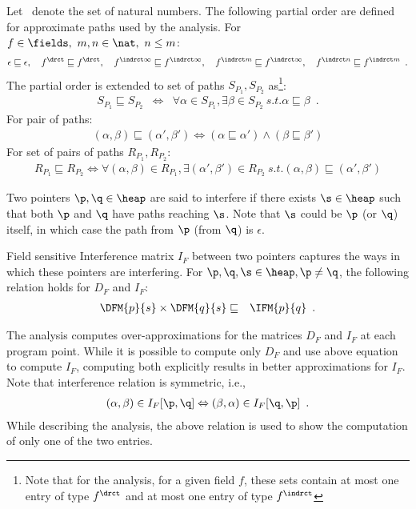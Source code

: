 Let \nat\ denote the set of natural numbers. The
following partial order are defined for approximate paths used by the
analysis. For $ f \in \fields,\ m,n \in \nat,\ n \leq m$:
$$
\epsilon \sqsubseteq \epsilon, \quad 
f^\drct \sqsubseteq  f^\drct,  \quad
f^{\indrct\infty}  \sqsubseteq  f^{\indrct\infty}, \quad
f^{\indrct m} \sqsubseteq f^{\indrct\infty}, \quad
f^{\indrct n} \sqsubseteq f^{\indrct m} \enspace .
$$
The partial order is extended to set of paths $S_{P_1},
S_{P_2}$ as\footnote{Note that for the analysis, for a given
  field $f$, these sets contain at most one entry of type
  $f^\drct$ and at most one entry of type $f^\indrct$}:
\begin{eqnarray*}
  S_{P_1} \sqsubseteq S_{P_2} &\Leftrightarrow& \forall \alpha \in
  S_{P_1}, \exists \beta \in S_{P_2}\ s.t. \alpha \sqsubseteq \beta \enspace .
\end{eqnarray*}
For pair of paths:
\begin{eqnarray*}
  (\alpha, \beta) \sqsubseteq (\alpha', \beta') 
  \Leftrightarrow 
   (\alpha \sqsubseteq \alpha')  \wedge
  (\beta \sqsubseteq  \beta')
\end{eqnarray*}
For set of pairs of paths $R_{P_1}, R_{P_2}$:
\begin{eqnarray*}
  R_{P_1} \sqsubseteq R_{P_2} \Leftrightarrow \forall
  (\alpha, \beta) \in
  R_{P_1}, \exists (\alpha', \beta') \in
  R_{P_2}\ s.t. (\alpha, \beta) \sqsubseteq (\alpha', \beta')
\end{eqnarray*}


Two pointers $\p,\q \in \heap$ are said to
interfere if there exists $\s \in \heap$ such that both
$\p$ and $\q$ have paths reaching $\s$. Note that $\s$ could
be $\p$ (or $\q$) itself, in which case the path from $\p$
(from $\q$) is $\epsilon$.

\begin{definition}\label{IFM_matrix}
Field sensitive Interference matrix $I_F$ between
two pointers captures the ways in which these pointers are
interfering.  For $\p, \q, \s \in \heap, \p \not= \q$,
the following relation holds for $D_F$ and $I_F$: 
\begin{eqnarray*}
  \DFM{p}{s} \times \DFM{q}{s} &\sqsubseteq&
  \IFM{p}{q} \enspace . \label {eq:rel-df-if}
\end{eqnarray*}
\end{definition}

The analysis computes over-approximations for the matrices
$D_F$ and $I_F$ at each program point. While it is possible
to compute only $D_F$ and use above equation to
compute $I_F$, computing both explicitly results in better
approximations for $I_F$. Note that interference relation is
symmetric, i.e.,
\begin{eqnarray*}
  (\alpha, \beta) \in I_F[\p, \q] \Leftrightarrow
   (\beta, \alpha) \in I_F[\q, \p] \enspace .
\end{eqnarray*}
While describing the analysis, the
above relation is used to show the computation of only one of the two
entries. 

